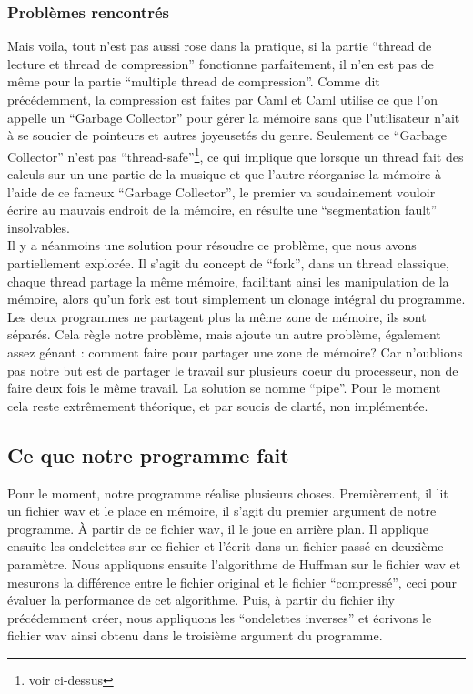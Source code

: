 \documentclass[a4paper,12pt]{article}
\begin{document}
		\subsubsection{Problèmes rencontrés}
Mais voila, tout n'est pas aussi rose dans la pratique, si la partie ``thread de
lecture et thread de compression'' fonctionne parfaitement, il n'en est pas de
même pour la partie ``multiple thread de compression''. Comme dit précédemment,
la compression est faites par Caml et Caml utilise ce que l'on appelle un
``Garbage Collector'' pour gérer la mémoire sans que l'utilisateur n'ait à se
soucier de pointeurs et autres joyeusetés du genre. Seulement ce ``Garbage
Collector'' n'est pas ``thread-safe''\footnote{voir ci-dessus}, ce qui implique
que lorsque un thread fait des calculs sur un une partie de la musique et que
l'autre réorganise la mémoire à l'aide de ce fameux ``Garbage Collector'', le
premier va soudainement vouloir écrire au mauvais endroit de la mémoire, en
résulte une ``segmentation fault'' insolvables.\\
Il y a néanmoins une solution pour résoudre ce problème, que nous avons
partiellement explorée. Il s'agit du concept de ``fork'', dans un thread
classique, chaque thread partage la même mémoire, facilitant ainsi les
manipulation de la mémoire, alors qu'un fork est tout simplement un clonage
intégral du programme. Les deux programmes ne partagent plus la même zone de
mémoire, ils sont séparés. Cela règle notre problème, mais ajoute un autre
problème, également assez génant : comment faire pour partager une zone de
mémoire? Car n'oublions pas notre but est de partager le travail sur plusieurs
coeur du processeur, non de faire deux fois le même travail. La solution se
nomme ``pipe''.  Pour le moment cela reste extrêmement théorique, et par soucis
de clarté, non implémentée.\\

	\subsection{Ce que notre programme fait}
Pour le moment, notre programme réalise plusieurs choses. Premièrement, il lit
un fichier wav et le place en mémoire, il s'agit du premier argument de notre
programme. À partir de ce fichier wav, il le joue en arrière plan. Il applique
ensuite les ondelettes sur ce fichier et l'écrit dans un fichier passé en
deuxième paramètre. Nous appliquons ensuite l'algorithme de Huffman sur le
fichier wav et mesurons la différence entre le fichier original et le fichier
``compressé'', ceci pour évaluer la performance de cet algorithme. Puis, à
partir du fichier ihy précédemment créer, nous appliquons les ``ondelettes
inverses'' et écrivons le fichier wav ainsi obtenu dans le troisième argument du
programme.\\
\end{document}
